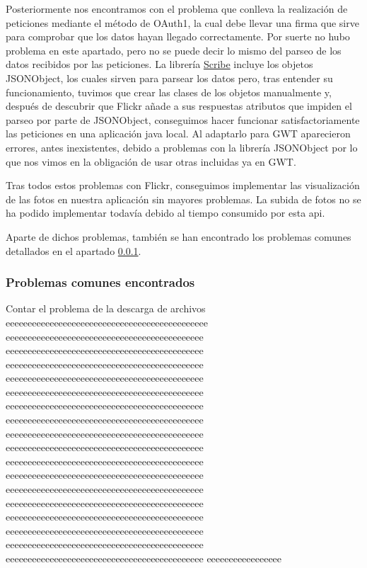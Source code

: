 \documentclass{scrartcl}
\begin{document}
Posteriormente nos encontramos con el problema que conlleva la realización de peticiones mediante el método de OAuth1, la cual debe llevar una firma que sirve para comprobar que los datos hayan llegado correctamente. Por suerte no hubo problema en este apartado, pero no se puede decir lo mismo del parseo de los datos recibidos por las peticiones. La librería \href{https://github.com/fernandezpablo85/scribe-java}{Scribe} incluye los objetos JSONObject, los cuales sirven para parsear los datos pero, tras entender su funcionamiento, tuvimos que crear las clases de los objetos manualmente y, después de descubrir que Flickr añade a sus respuestas atributos que impiden el parseo por parte de JSONObject, conseguimos hacer funcionar satisfactoriamente las peticiones en una aplicación java local. Al adaptarlo para GWT aparecieron errores, antes inexistentes, debido a problemas con la librería JSONObject por lo que nos vimos en la obligación de usar otras incluidas ya en GWT.

Tras todos estos problemas con Flickr, conseguimos implementar las visualización de las fotos en nuestra aplicación sin mayores problemas. La subida de fotos no se ha podido implementar todavía debido al tiempo consumido por esta api.

Aparte de dichos problemas, también se han encontrado los problemas comunes detallados en el apartado \ref{cap:problemasComunesEncontrados}.

\subsubsection{Problemas comunes encontrados}\label{cap:problemasComunesEncontrados}
Contar el problema de la descarga de archivos eeeeeeeeeeeeeeeeeeeeeeeeeeeeeeeeeeeeeeeeeeeeee
eeeeeeeeeeeeeeeeeeeeeeeeeeeeeeeeeeeeeeeeeeeee
eeeeeeeeeeeeeeeeeeeeeeeeeeeeeeeeeeeeeeeeeeeee
eeeeeeeeeeeeeeeeeeeeeeeeeeeeeeeeeeeeeeeeeeeee
eeeeeeeeeeeeeeeeeeeeeeeeeeeeeeeeeeeeeeeeeeeee
eeeeeeeeeeeeeeeeeeeeeeeeeeeeeeeeeeeeeeeeeeeee
eeeeeeeeeeeeeeeeeeeeeeeeeeeeeeeeeeeeeeeeeeeee
eeeeeeeeeeeeeeeeeeeeeeeeeeeeeeeeeeeeeeeeeeeee
eeeeeeeeeeeeeeeeeeeeeeeeeeeeeeeeeeeeeeeeeeeee
eeeeeeeeeeeeeeeeeeeeeeeeeeeeeeeeeeeeeeeeeeeee
eeeeeeeeeeeeeeeeeeeeeeeeeeeeeeeeeeeeeeeeeeeee
eeeeeeeeeeeeeeeeeeeeeeeeeeeeeeeeeeeeeeeeeeeee
eeeeeeeeeeeeeeeeeeeeeeeeeeeeeeeeeeeeeeeeeeeee
eeeeeeeeeeeeeeeeeeeeeeeeeeeeeeeeeeeeeeeeeeeee
eeeeeeeeeeeeeeeeeeeeeeeeeeeeeeeeeeeeeeeeeeeee
eeeeeeeeeeeeeeeeeeeeeeeeeeeeeeeeeeeeeeeeeeeee
eeeeeeeeeeeeeeeeeeeeeeeeeeeeeeeeeeeeeeeeeeeee
eeeeeeeeeeeeeeeeeeeeeeeeeeeeeeeeeeeeeeeeeeeee
eeeeeeeeeeeeeeeee
\end{document}
